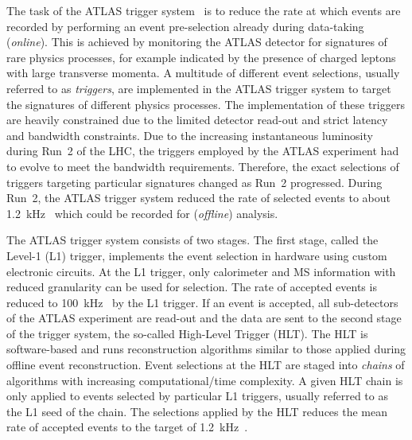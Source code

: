 The task of the ATLAS trigger system~\cite{TRIG-2019-04} is to reduce the rate
at which events are recorded by performing an event pre-selection already during
data-taking (\emph{online}). This is achieved by monitoring the ATLAS detector
for signatures of rare physics processes, for example indicated by the presence
of charged leptons with large transverse momenta. A multitude of different event
selections, usually referred to as \emph{triggers}, are implemented in the ATLAS
trigger system to target the signatures of different physics processes. The
implementation of these triggers are heavily constrained due to the limited
detector read-out and strict latency and bandwidth constraints. Due to the
increasing instantaneous luminosity during Run~2 of the LHC, the triggers
employed by the ATLAS experiment had to evolve to meet the bandwidth
requirements. Therefore, the exact selections of triggers targeting particular
signatures changed as Run~2 progressed. During Run~2, the ATLAS trigger system
reduced the rate of selected events to about
\SI{1.2}{\kilo\hertz}~\cite{TRIG-2019-04} which could be recorded for
(\emph{offline}) analysis.

The ATLAS trigger system consists of two stages. The first stage, called the
Level-1 (L1) trigger, implements the event selection in hardware using custom
electronic circuits. At the L1 trigger, only calorimeter and MS information with
reduced granularity can be used for selection. The rate of accepted events is
reduced to \SI{100}{\kilo\hertz}~\cite{TRIG-2019-04} by the L1 trigger. If an
event is accepted, all sub-detectors of the ATLAS experiment are read-out and
the data are sent to the second stage of the trigger system, the so-called
High-Level Trigger (HLT). The HLT is software-based and runs reconstruction
algorithms similar to those applied during offline event reconstruction.  Event
selections at the HLT are staged into \emph{chains} of algorithms with
increasing computational/time complexity. A given HLT chain is only applied to
events selected by particular L1 triggers, usually referred to as the L1 seed of
the chain. The selections applied by the HLT reduces the mean rate of accepted
events to the target of \SI{1.2}{\kilo\hertz}~\cite{TRIG-2019-04}.


